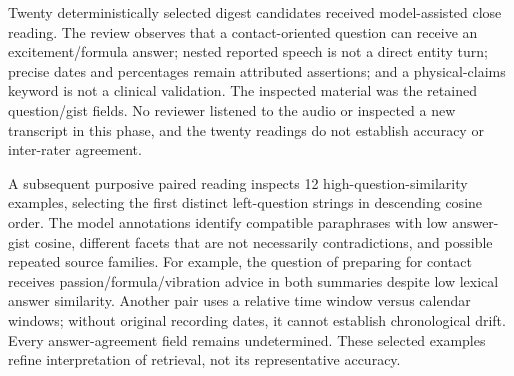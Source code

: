 Twenty deterministically selected digest candidates received model-assisted close reading. The review observes that a contact-oriented question can receive an excitement/formula answer; nested reported speech is not a direct entity turn; precise dates and percentages remain attributed assertions; and a physical-claims keyword is not a clinical validation. The inspected material was the retained question/gist fields. No reviewer listened to the audio or inspected a new transcript in this phase, and the twenty readings do not establish accuracy or inter-rater agreement.

A subsequent purposive paired reading inspects 12 high-question-similarity examples, selecting the first distinct left-question strings in descending cosine order. The model annotations identify compatible paraphrases with low answer-gist cosine, different facets that are not necessarily contradictions, and possible repeated source families. For example, the question of preparing for contact receives passion/formula/vibration advice in both summaries despite low lexical answer similarity. Another pair uses a relative time window versus calendar windows; without original recording dates, it cannot establish chronological drift. Every answer-agreement field remains undetermined. These selected examples refine interpretation of retrieval, not its representative accuracy.
